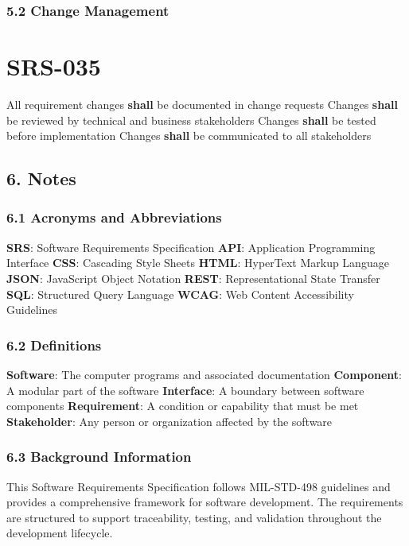 \subsubsection{5.2 Change Management}

\section{SRS-035}\label{SRS-035}

All requirement changes \textbf{shall} be documented in change requests
Changes \textbf{shall} be reviewed by technical and business stakeholders
Changes \textbf{shall} be tested before implementation
Changes \textbf{shall} be communicated to all stakeholders

\subsection{6. Notes}

\subsubsection{6.1 Acronyms and Abbreviations}
\textbf{SRS}: Software Requirements Specification
\textbf{API}: Application Programming Interface
\textbf{CSS}: Cascading Style Sheets
\textbf{HTML}: HyperText Markup Language
\textbf{JSON}: JavaScript Object Notation
\textbf{REST}: Representational State Transfer
\textbf{SQL}: Structured Query Language
\textbf{WCAG}: Web Content Accessibility Guidelines

\subsubsection{6.2 Definitions}
\textbf{Software}: The computer programs and associated documentation
\textbf{Component}: A modular part of the software
\textbf{Interface}: A boundary between software components
\textbf{Requirement}: A condition or capability that must be met
\textbf{Stakeholder}: Any person or organization affected by the software

\subsubsection{6.3 Background Information}

This Software Requirements Specification follows MIL-STD-498 guidelines and provides a comprehensive framework for software development. The requirements are structured to support traceability, testing, and validation throughout the development lifecycle.

